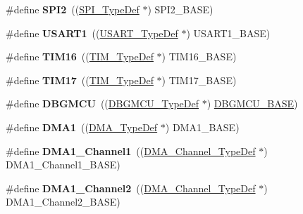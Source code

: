 \begin{DoxyCompactItemize}
\#define {\bfseries S\+P\+I2}~((\hyperlink{struct_s_p_i___type_def}{S\+P\+I\+\_\+\+Type\+Def} $\ast$) S\+P\+I2\+\_\+\+B\+A\+SE)
\item 
\mbox{\label{group___peripheral__declaration_ga92871691058ff7ccffd7635930cb08da}} 
\#define {\bfseries U\+S\+A\+R\+T1}~((\hyperlink{struct_u_s_a_r_t___type_def}{U\+S\+A\+R\+T\+\_\+\+Type\+Def} $\ast$) U\+S\+A\+R\+T1\+\_\+\+B\+A\+SE)
\item 
\mbox{\label{group___peripheral__declaration_ga73ec606e7dacf17e18c661e8ff8c7c8d}} 
\#define {\bfseries T\+I\+M16}~((\hyperlink{struct_t_i_m___type_def}{T\+I\+M\+\_\+\+Type\+Def} $\ast$) T\+I\+M16\+\_\+\+B\+A\+SE)
\item 
\mbox{\label{group___peripheral__declaration_ga65aea6c8b36439e44ad6cde0e6891aab}} 
\#define {\bfseries T\+I\+M17}~((\hyperlink{struct_t_i_m___type_def}{T\+I\+M\+\_\+\+Type\+Def} $\ast$) T\+I\+M17\+\_\+\+B\+A\+SE)
\item 
\mbox{\label{group___peripheral__declaration_ga92ec6d9ec2251fda7d4ce09748cd74b4}} 
\#define {\bfseries D\+B\+G\+M\+CU}~((\hyperlink{struct_d_b_g_m_c_u___type_def}{D\+B\+G\+M\+C\+U\+\_\+\+Type\+Def} $\ast$) \hyperlink{group___peripheral__memory__map_ga4adaf4fd82ccc3a538f1f27a70cdbbef}{D\+B\+G\+M\+C\+U\+\_\+\+B\+A\+SE})
\item 
\mbox{\label{group___peripheral__declaration_gacc16d2a5937f7585320a98f7f6b578f9}} 
\#define {\bfseries D\+M\+A1}~((\hyperlink{struct_d_m_a___type_def}{D\+M\+A\+\_\+\+Type\+Def} $\ast$) D\+M\+A1\+\_\+\+B\+A\+SE)
\item 
\mbox{\label{group___peripheral__declaration_gac83c5be824be1c02716e2522e80ddf7a}} 
\#define {\bfseries D\+M\+A1\+\_\+\+Channel1}~((\hyperlink{struct_d_m_a___channel___type_def}{D\+M\+A\+\_\+\+Channel\+\_\+\+Type\+Def} $\ast$) D\+M\+A1\+\_\+\+Channel1\+\_\+\+B\+A\+SE)
\item 
\mbox{\label{group___peripheral__declaration_ga23d7631dd10c645e06971b2543ba2949}} 
\#define {\bfseries D\+M\+A1\+\_\+\+Channel2}~((\hyperlink{struct_d_m_a___channel___type_def}{D\+M\+A\+\_\+\+Channel\+\_\+\+Type\+Def} $\ast$) D\+M\+A1\+\_\+\+Channel2\+\_\+\+B\+A\+SE)

\end{DoxyCompactItemize}

